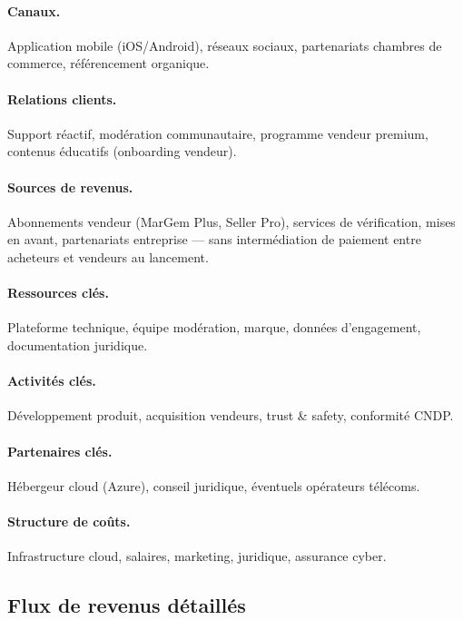 \paragraph{Canaux.} Application mobile (iOS/Android), réseaux sociaux, partenariats chambres de commerce, référencement organique.

\paragraph{Relations clients.} Support réactif, modération communautaire, programme vendeur premium, contenus éducatifs (onboarding vendeur).

\paragraph{Sources de revenus.} Abonnements vendeur (MarGem Plus, Seller Pro), services de vérification, mises en avant, partenariats entreprise --- sans intermédiation de paiement entre acheteurs et vendeurs au lancement.

\paragraph{Ressources clés.} Plateforme technique, équipe modération, marque, données d'engagement, documentation juridique.

\paragraph{Activités clés.} Développement produit, acquisition vendeurs, trust \& safety, conformité CNDP.

\paragraph{Partenaires clés.} Hébergeur cloud (Azure), conseil juridique, éventuels opérateurs télécoms.

\paragraph{Structure de coûts.} Infrastructure cloud, salaires, marketing, juridique, assurance cyber.


\subsection{Flux de revenus détaillés}

